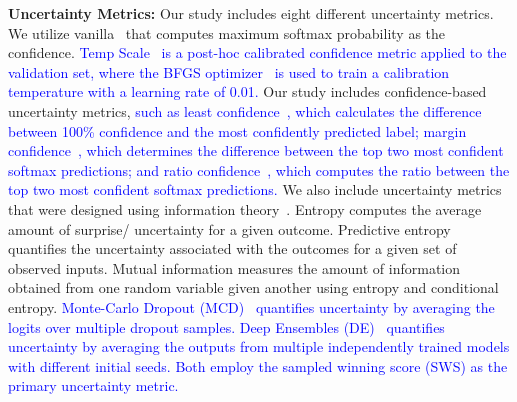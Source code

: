 \textbf{Uncertainty Metrics: } 
Our study includes eight different uncertainty metrics. We utilize vanilla~\cite{hendrycks2018baseline} that computes maximum softmax probability as the confidence. \textcolor{blue}{Temp Scale~\cite{guo2017calibration} is a post-hoc calibrated confidence metric applied to the validation set, where the BFGS optimizer~\cite{international1990bfgs} is used to train a calibration temperature with a learning rate of 0.01.} Our study includes confidence-based uncertainty metrics, \textcolor{blue}{such as least confidence~\cite{monarch2021human}, which calculates the difference between 100\% confidence and the most confidently predicted label; margin confidence~\cite{monarch2021human}, which determines the difference between the top two most confident softmax predictions; and ratio confidence~\cite{monarch2021human}, which computes the ratio between the top two most confident softmax predictions.} We also include uncertainty metrics that were designed using information theory~\cite{steinhardt2016unsupervised,shannon1948mathematical}. Entropy computes the average amount of surprise/ uncertainty for a given outcome. Predictive entropy quantifies the uncertainty associated with the outcomes for a given set of observed inputs. Mutual information measures the amount of information obtained from one random variable given another using entropy and conditional entropy. 
\textcolor{blue}{Monte-Carlo Dropout (MCD)~\cite{gal2016dropout} quantifies uncertainty by averaging the logits over multiple dropout samples. Deep Ensembles (DE)~\cite{lakshminarayanan2017simple} quantifies uncertainty by averaging the outputs from multiple independently trained models with different initial seeds. Both employ the sampled winning score (SWS) as the primary uncertainty metric.}

